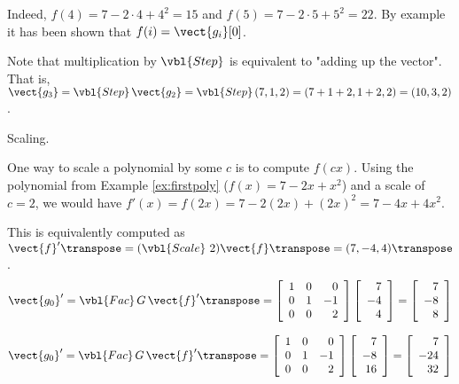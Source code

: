 Indeed, $f(4) = 7 - 2\cdot 4 + 4^2 = 15$ and $f(5) = 7 - 2\cdot 5 + 5^2 = 22$.
By example it has been shown that $f(i) = \vect{g_i} [0]$.

Note that multiplication by $\vbl{Step}$ is equivalent to "adding up the vector".
That is, $\vect{g_3} = \vbl{Step}\,\vect{g_2} = \vbl{Step}\,(7, 1, 2) = (7+1+2, 1+2, 2) = (10, 3, 2)$.

\begin{example}
 Scaling.
\end{example}

One way to scale a polynomial by some $c$ is to compute $f(cx)$.
Using the polynomial from Example \ref{ex:firstpoly} ($f(x)= 7 - 2x + x^2$) and a scale of $c=2$, we would have $f'(x) = f(2x) = 7 - 2 (2x) + (2x)^2 = 7 - 4x + 4x^2$.

This is equivalently computed as ${\vect{f}'}\transpose = (\vbl{Scale}\ 2) \vect{f}\transpose = {(7, -4, 4)}\transpose$.
\[
 \vect{g_0}' =
 \vbl{Fac}\,G\,{\vect{f}'} \transpose =
 \left[\begin{array}{rrr}
   1 & 0 &  0 \\
   0 & 1 & -1 \\
   0 & 0 &  2 \\
 \end{array}\right]
 \left[\begin{array}{r}
   7 \\ -4 \\ 4 \\
 \end{array}\right]
 =
 \left[\begin{array}{r}
   7 \\ -8 \\ 8 \\
 \end{array}\right]
\]

\[
 \vect{g_0}' =
 \vbl{Fac}\,G\,{\vect{f}'} \transpose =
 \left[\begin{array}{rrr}
   1 & 0 &  0 \\
   0 & 1 & -1 \\
   0 & 0 &  2 \\
 \end{array}\right]
 \left[\begin{array}{r}
   7 \\ -8 \\ 16 \\
 \end{array}\right]
 =
 \left[\begin{array}{r}
   7 \\ -24 \\ 32 \\
 \end{array}\right]
\]

